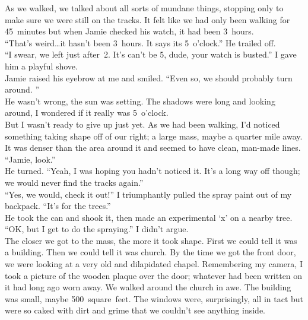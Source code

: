 \documentclass[a5paper]{scrartcl}
\begin{document}
As we walked, we talked about all sorts of mundane things, stopping only to make sure we were still on the tracks. It felt like we had only been walking for 45~minutes but when Jamie checked his watch, it had been 3~hours.\\


\enquote{That's weird\dots it hasn't been 3~hours. It says its 5~o'clock.} He trailed off.\\


\enquote{I swear, we left just after~2. It's can't be 5, dude, your watch is busted.} I gave him a playful shove.\\


Jamie raised his eyebrow at me and smiled. \enquote{Even so, we should probably turn around. }\\


He wasn't wrong, the sun was setting. The shadows were long and looking around, I wondered if it really was 5~o'clock. \\


But I wasn't ready to give up just yet. As we had been walking, I'd noticed something taking shape off of our right; a large mass, maybe a quarter mile away. It was denser than the area around it and seemed to have clean, man-made lines. \\


\enquote{Jamie, look.} \\


He turned. \enquote{Yeah, I was hoping you hadn't noticed it. It's a long way off though; we would never find the tracks again.}\\


\enquote{Yes, we would, check it out!} I triumphantly pulled the spray paint out of my backpack. \enquote{It's for the trees.}\\


He took the can and shook it, then made an experimental ‘x' on a nearby tree. \\


\enquote{OK, but I get to do the spraying.} I didn't argue.\\


The closer we got to the mass, the more it took shape. First we could tell it was a building. Then we could tell it was church.  By the time we got the front door, we were looking at a very old and dilapidated chapel. Remembering my camera, I took a picture of the wooden plaque over the door; whatever had been written on it had long ago worn away. We walked around the church in awe. The building was small, maybe 500~square~feet. The windows were, surprisingly, all in tact but were so caked with dirt and grime that we couldn't see anything inside. \\
\end{document}
